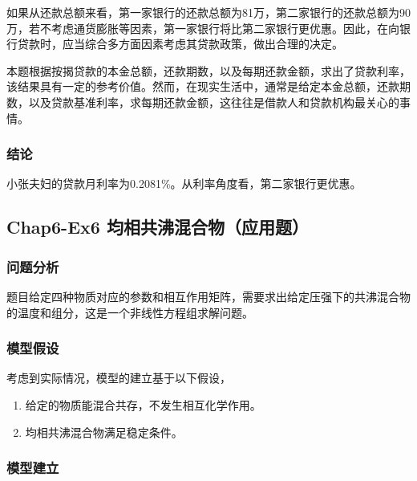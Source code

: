\documentclass[12pt,a4paper]{article}
\begin{document}
如果从还款总额来看，第一家银行的还款总额为81万，第二家银行的还款总额为90万，若不考虑通货膨胀等因素，第一家银行将比第二家银行更优惠。因此，在向银行贷款时，应当综合多方面因素考虑其贷款政策，做出合理的决定。

本题根据按揭贷款的本金总额，还款期数，以及每期还款金额，求出了贷款利率，该结果具有一定的参考价值。然而，在现实生活中，通常是给定本金总额，还款期数，以及贷款基准利率，求每期还款金额，这往往是借款人和贷款机构最关心的事情。

\subsubsection{结论}

小张夫妇的贷款月利率为0.2081\%。从利率角度看，第二家银行更优惠。

\subsection{Chap6-Ex6 均相共沸混合物（应用题）}

\subsubsection{问题分析}

题目给定四种物质对应的参数和相互作用矩阵，需要求出给定压强下的共沸混合物的温度和组分，这是一个非线性方程组求解问题。

\subsubsection{模型假设}

考虑到实际情况，模型的建立基于以下假设，
\begin{enumerate}
    \item 给定的物质能混合共存，不发生相互化学作用。
    \item 均相共沸混合物满足稳定条件。
\end{enumerate}

\subsubsection{模型建立}
\end{document}
